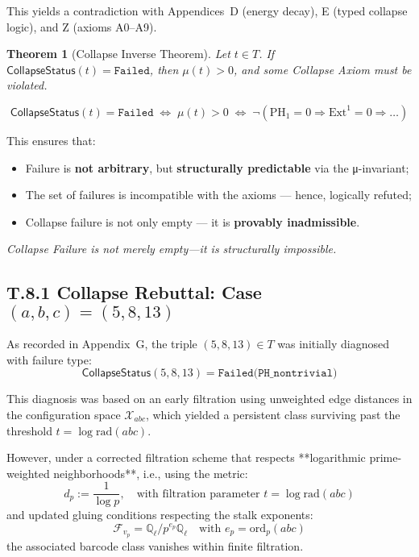 \documentclass[11pt]{article}
\newtheorem{theorem}{Theorem}[section]
\begin{document}
This yields a contradiction with Appendices~D (energy decay), E (typed collapse logic), and Z (axioms A0–A9).

\begin{theorem}[Collapse Inverse Theorem]
\label{thm:collapse-inverse}
Let \( t \in T \). If \( \mathsf{CollapseStatus}(t) = \texttt{Failed} \),  
then \( \mu(t) > 0 \), and some Collapse Axiom must be violated.

\[
\boxed{
\mathsf{CollapseStatus}(t) = \texttt{Failed} \;\Longleftrightarrow\; \mu(t) > 0 \;\Longleftrightarrow\;
\neg(\mathrm{PH}_1 = 0 \Rightarrow \mathrm{Ext}^1 = 0 \Rightarrow \ldots)
}
\]
\end{theorem}

\noindent
This ensures that:
\begin{itemize}
  \item Failure is \textbf{not arbitrary}, but \textbf{structurally predictable} via the μ-invariant;
  \item The set of failures is incompatible with the axioms — hence, logically refuted;
  \item Collapse failure is not only empty — it is \textbf{provably inadmissible}.
\end{itemize}

\begin{center}
\textit{Collapse Failure is not merely empty—it is structurally impossible.}
\end{center}

\subsection*{T.8.1 Collapse Rebuttal: Case \( (a,b,c) = (5,8,13) \)}

As recorded in Appendix~G, the triple \( (5,8,13) \in T \) was initially diagnosed with failure type:
\[
\mathsf{CollapseStatus}(5,8,13) = \texttt{Failed(PH\_nontrivial)}
\]

This diagnosis was based on an early filtration using unweighted edge distances in the configuration space \( \mathcal{X}_{abc} \),  
which yielded a persistent class surviving past the threshold \( t = \log \mathrm{rad}(abc) \).

However, under a corrected filtration scheme that respects **logarithmic prime-weighted neighborhoods**,  
i.e., using the metric:
\[
d_p := \frac{1}{\log p}, \quad \text{with filtration parameter } t = \log \mathrm{rad}(abc)
\]
and updated gluing conditions respecting the stalk exponents:
\[
\mathcal{F}_{v_p} = \mathbb{Q}_\ell / p^{e_p} \mathbb{Q}_\ell
\quad \text{with } e_p = \mathrm{ord}_p(abc)
\]
the associated barcode class vanishes within finite filtration.
\end{document}

